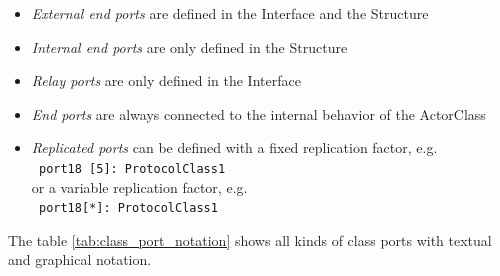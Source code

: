 \begin{itemize}
\item \textit{External end ports} are defined in the Interface and the Structure
\item \textit{Internal end ports} are only defined in the Structure
\item \textit{Relay ports} are only defined in the Interface
\item \textit{End ports} are always connected to the internal behavior of the ActorClass
\item \textit{Replicated ports} can be defined with a fixed replication factor, e.g.\\
\texttt{ port18 [5]: ProtocolClass1}\\
or a variable replication factor, e.g.\\
\texttt{ port18[*]: ProtocolClass1}
\end{itemize}

The table \ref{tab:class_port_notation} shows all kinds of class ports with textual and graphical notation.

